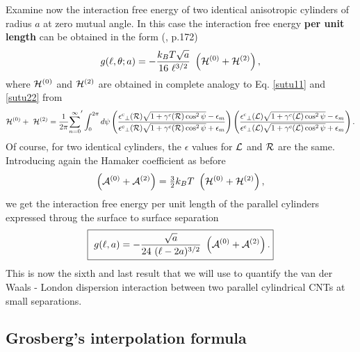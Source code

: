 \documentclass[onecolumn,letterpaper,amsmath,amssymb,floatfix,aps,superscriptaddress]{revtex4}
\begin{document}
Examine now the interaction free energy of two identical anisotropic
cylinders of radius $a$ at zero mutual angle. In this case the interaction free
energy \textbf{per unit length} can be obtained in the form 
(\cite{Parsegian}, p.172)
\begin{equation}
g(\ell,\theta;a)=-\frac{k_{B}T \sqrt{a}}{16~\ell^{3/2}}~\left({\cal H}^{(0)}+{\cal H}^{(2)}\right),\label{pop-equ25}\end{equation}
 where ${\cal H}^{(0)}$ and ${\cal H}^{(2)}$ are obtained in complete
analogy to Eq. \ref{sutu11} and \ref{sutu22} from \begin{equation}
{\cal H}^{(0)}+~{\cal H}^{(2)}=\frac{1}{2\pi}{\sum_{n=0}^{\infty}}'\int_{0}^{2\pi}d\psi\left(\frac{{{\epsilon^{c}}_{\perp}({\cal R})}\sqrt{1+{\gamma^{c}}({\cal R})\cos^{2}{\psi}}-\epsilon_{m}}{{{\epsilon^{c}}_{\perp}({\cal R})}\sqrt{1+{\gamma^{c}}({\cal R})\cos^{2}{\psi}}+\epsilon_{m}}\right)\left(\frac{{{\epsilon^{c}}_{\perp}({\cal L})}\sqrt{1+{\gamma^{c}}({\cal L})\cos^{2}{\psi}}-\epsilon_{m}}{{{\epsilon^{c}}_{\perp}({\cal L})}\sqrt{1+{\gamma^{c}}({\cal L})\cos^{2}{\psi}}+\epsilon_{m}}\right).\label{pop-stu11}\end{equation}
 Of course, for two identical cylinders, the $\epsilon$ values for ${\cal L}$ and ${\cal R}$ are the same. Introducing again the Hamaker coefficient as before 
\begin{equation}
\left({\cal A}^{(0)}+{\cal A}^{(2)}\right)={\textstyle \frac{3}{2}}k_{B}T~\left({\cal H}^{(0)}+{\cal H}^{(2)}\right),\end{equation}
we get the interaction free energy per unit length of the parallel cylinders expressed throug the surface to surface separation
 \begin{equation}
  \fbox{
    $\displaystyle{
g(\ell,a)=-\frac{\sqrt{a}}{24~(\ell - 2a)^{3/2}}~\left({\cal A}^{(0)}+{\cal A}^{(2)}\right).\label{pop-equ26}}$}
\end{equation}
 This is now the sixth and last result that we will use to quantify
the van der Waals - London dispersion interaction between two parallel
cylindrical CNTs at small separations. 

\subsection{Grosberg's interpolation formula}
\end{document}

